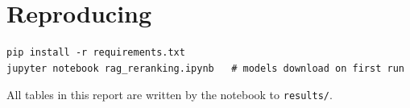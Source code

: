 \documentclass[11pt,a4paper]{article}
\begin{document}
\appendix
\section*{Reproducing}

\begin{verbatim}
pip install -r requirements.txt
jupyter notebook rag_reranking.ipynb   # models download on first run
\end{verbatim}
All tables in this report are written by the notebook to \texttt{results/}.
\end{document}
